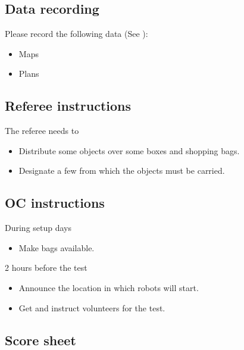 \subsection{Data recording}
  Please record the following data (See ):
\begin{itemize}
 \item Maps
 \item Plans
\end{itemize}

\subsection{Referee instructions}

The referee needs to
\begin{itemize}
  \item Distribute some objects over some boxes and shopping bags.
  \item Designate a few  from which the objects must be carried.
\end{itemize}

\subsection{OC instructions}

During setup days
\begin{itemize}
  \item Make bags available.
\end{itemize}

2 hours before the test
\begin{itemize}
  \item Announce the location in which robots will start.
  \item Get and instruct volunteers for the test.
\end{itemize}

\newpage
\subsection{Score sheet}


